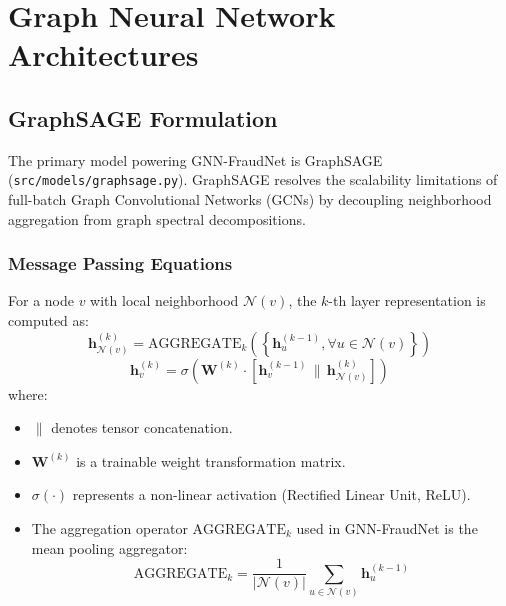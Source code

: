 \documentclass[11pt,a4paper]{report}
\begin{document}
\chapter{Graph Neural Network Architectures}

\section{GraphSAGE Formulation}
The primary model powering GNN-FraudNet is GraphSAGE (\texttt{src/models/graphsage.py}). GraphSAGE resolves the scalability limitations of full-batch Graph Convolutional Networks (GCNs) by decoupling neighborhood aggregation from graph spectral decompositions.

\subsection{Message Passing Equations}
For a node $v$ with local neighborhood $\mathcal{N}(v)$, the $k$-th layer representation is computed as:
\[
\mathbf{h}_{\mathcal{N}(v)}^{(k)} = \text{AGGREGATE}_k \left( \left\{ \mathbf{h}_u^{(k-1)}, \forall u \in \mathcal{N}(v) \right\} \right)
\]
\[
\mathbf{h}_v^{(k)} = \sigma \left( \mathbf{W}^{(k)} \cdot \left[ \mathbf{h}_v^{(k-1)} \,\|\, \mathbf{h}_{\mathcal{N}(v)}^{(k)} \right] \right)
\]
where:
\begin{itemize}[leftmargin=1.5em]
  \item $\|$ denotes tensor concatenation.
  \item $\mathbf{W}^{(k)}$ is a trainable weight transformation matrix.
  \item $\sigma(\cdot)$ represents a non-linear activation (Rectified Linear Unit, ReLU).
  \item The aggregation operator $\text{AGGREGATE}_k$ used in GNN-FraudNet is the mean pooling aggregator:
  \[
  \text{AGGREGATE}_k = \frac{1}{|\mathcal{N}(v)|} \sum_{u \in \mathcal{N}(v)} \mathbf{h}_u^{(k-1)}
  \]
\end{itemize}
\end{document}
